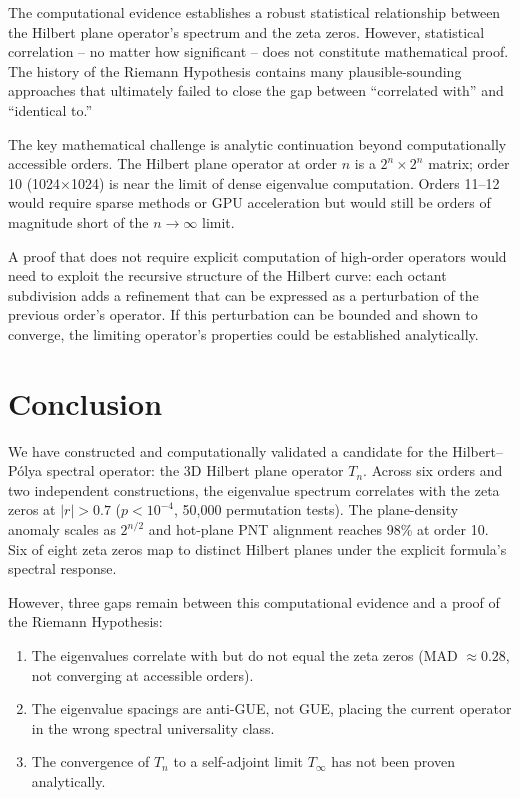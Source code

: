 \documentclass[11pt,a4paper]{article}
\begin{document}
The computational evidence establishes a robust statistical
relationship between the Hilbert plane operator's spectrum and the zeta
zeros.  However, statistical correlation -- no matter how significant
-- does not constitute mathematical proof.  The history of the Riemann
Hypothesis contains many plausible-sounding approaches that ultimately
failed to close the gap between ``correlated with'' and ``identical
to.''

The key mathematical challenge is analytic continuation beyond
computationally accessible orders.  The Hilbert plane operator at
order $n$ is a $2^n \times 2^n$ matrix; order 10 (1024$\times$1024)
is near the limit of dense eigenvalue computation.  Orders 11--12
would require sparse methods or GPU acceleration but would still be
orders of magnitude short of the $n \to \infty$ limit.

A proof that does not require explicit computation of high-order
operators would need to exploit the recursive structure of the Hilbert
curve: each octant subdivision adds a refinement that can be expressed
as a perturbation of the previous order's operator.  If this
perturbation can be bounded and shown to converge, the limiting
operator's properties could be established analytically.

\section{Conclusion}

We have constructed and computationally validated a candidate for the
Hilbert--P\'{o}lya spectral operator: the 3D Hilbert plane operator
$T_n$.  Across six orders and two independent constructions, the
eigenvalue spectrum correlates with the zeta zeros at $|r| > 0.7$
($p < 10^{-4}$, 50,000 permutation tests).  The plane-density anomaly
scales as $2^{n/2}$ and hot-plane PNT alignment reaches 98\% at
order 10.  Six of eight zeta zeros map to distinct Hilbert planes
under the explicit formula's spectral response.

However, three gaps remain between this computational evidence and a
proof of the Riemann Hypothesis:

\begin{enumerate}
\item The eigenvalues correlate with but do not equal the zeta zeros
   (MAD $\approx 0.28$, not converging at accessible orders).
\item The eigenvalue spacings are anti-GUE, not GUE, placing the
   current operator in the wrong spectral universality class.
\item The convergence of $T_n$ to a self-adjoint limit $T_\infty$
   has not been proven analytically.
\end{enumerate}
\end{document}
